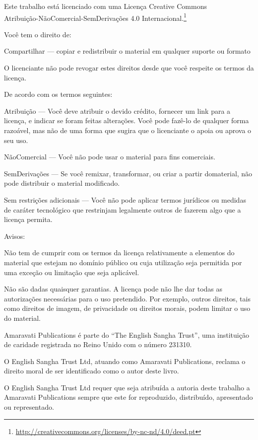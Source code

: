 \cleartorecto
\thispagestyle{chapter}
{\copyrightsize\setlength{\parindent}{0pt}%
\raggedright\label{copyright-details}
\setlength{\parskip}{7pt}

{\centering

{\LARGE\ccbyncnd}

Este trabalho está licenciado com uma Licença Creative Commons\\
Atribuição-NãoComercial-SemDerivações 4.0 Internacional.\footnote{%
\href{http://creativecommons.org/licenses/by-nc-nd/4.0/deed.pt}{http://creativecommons.org/licenses/by-nc-nd/4.0/deed.pt}}

}

Você tem o direito de:

\begin{packeditemize}
\item Compartilhar — copiar e redistribuir o material em qualquer suporte ou formato
\end{packeditemize}

O licenciante não pode revogar estes direitos desde que você respeite os termos da licença.

De acordo com os termos seguintes:

\begin{packeditemize}
\item Atribuição — Você deve atribuir o devido crédito, fornecer um link para a licença, e indicar se foram feitas alterações. Você pode fazê-lo de qualquer forma razoável, mas não de uma forma que sugira que o licenciante o apoia ou aprova o seu uso.
\item NãoComercial — Você não pode usar o material para fins comerciais.
\item SemDerivações — Se você remixar, transformar, ou criar a partir domaterial, não pode distribuir o material modificado.
\end{packeditemize}

Sem restrições adicionais — Você não pode aplicar termos jurídicos ou medidas de caráter tecnológico que restrinjam legalmente outros de fazerem algo que a licença permita.

Avisos:

Não tem de cumprir com os termos da licença relativamente a elementos do material que estejam no domínio público ou cuja utilização seja permitida por uma exceção ou limitação que seja aplicável.

Não são dadas quaisquer garantias. A licença pode não lhe dar todas as autorizações necessárias para o uso pretendido. Por exemplo, outros direitos, tais como direitos de imagem, de privacidade ou direitos morais, podem limitar o uso do material.

Amaravati Publications é parte do ``The English Sangha Trust'', uma
instituição de caridade registrada no Reino Unido com o número 231310.

O English Sangha Trust Ltd, atuando como Amaravati Publications, reclama
o direito moral de ser identiﬁcado como o autor deste livro.

O English Sangha Trust Ltd requer que seja atribuída a autoria deste
trabalho a Amaravati Publications sempre que este for reproduzido,
distribuído, apresentado ou representado.

}
